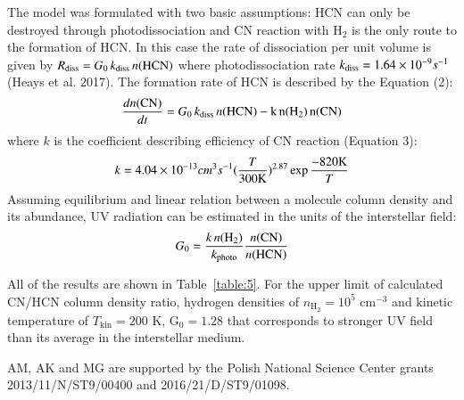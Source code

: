 \documentclass{aa}
\begin{document}
The model was formulated with two basic assumptions: HCN can only be destroyed through photodissociation and CN reaction with H$_2$ is the only route to the formation of HCN. In this case the rate of dissociation per unit volume is given by $R_{\rm{diss}} =  G_0\,k_{\rm{diss}}\, n(\rm{HCN})$ where photodissociation rate $k_{\rm{diss}} = 1.64\times10^{-9} s^{-1}$ (Heays et al. 2017). 
The formation rate of HCN is described by the Equation (2):
\begin{equation} \label{eq1}
\frac{dn(\rm{CN})}{dt} =  G_0\,k_{\rm{diss}}\, n(\rm{HCN}) - k\,n(\rm{H}_2)\, n(\rm{CN})
\end{equation}
where $k$ is the coefficient describing efficiency of CN reaction (Equation 3):
\begin{equation} \label{eq2}
k = 4.04\times10^{-13} cm^{3} s^{-1} (\frac{T}{300\rm{K}})^{2.87} \exp{\frac{-820\rm{K}}{T}}
\end{equation}
Assuming equilibrium and linear relation between a molecule column density and its abundance, UV radiation can be estimated in the units of the interstellar field:
\begin{equation} \label{eq3}
G_0 = \frac{k \,n(\rm{H}_2)}{k_{\rm{photo}}} \frac{n(\rm{CN})}{n(\rm{HCN})}
\end{equation}

All of the results are shown in Table~\ref{table:5}. For the upper limit of calculated CN/HCN column density ratio, hydrogen densities of $n_\mathrm{H_2} = 10^5$ cm$^{-3}$ and kinetic temperature of $T_\mathrm{kin} = 200$ K, G$_0 = 1.28$ that corresponds to stronger UV field than its average in the interstellar medium. 

\begin{acknowledgements}
AM, AK and MG are supported by the Polish National Science Center grants 2013/11/N/ST9/00400 and 2016/21/D/ST9/01098. 
\end{acknowledgements}

%
%
\end{document}
